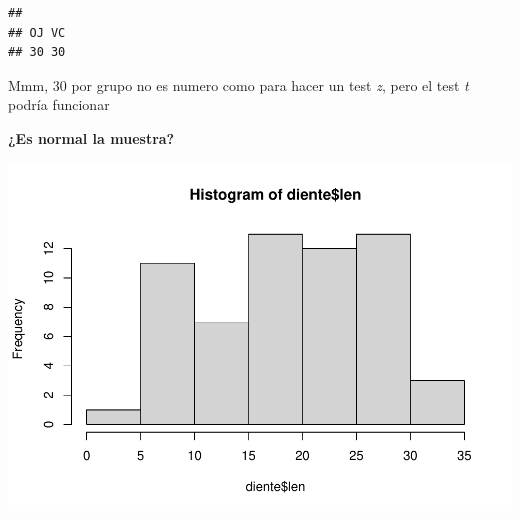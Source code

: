 \documentclass[
]{book}
\newenvironment{Shaded}{\begin{snugshade}}{\end{snugshade}}
\newcommand{\DocumentationTok}[1]{\textcolor[rgb]{0.56,0.35,0.01}{\textbf{\textit{#1}}}}
\newcommand{\FunctionTok}[1]{\textcolor[rgb]{0.00,0.00,0.00}{#1}}
\newcommand{\NormalTok}[1]{#1}
\newcommand{\SpecialCharTok}[1]{\textcolor[rgb]{0.00,0.00,0.00}{#1}}
\begin{document}
\begin{Shaded}
\end{Shaded}

\begin{verbatim}
## 
## OJ VC 
## 30 30
\end{verbatim}

Mmm, 30 por grupo no es numero como para hacer un test \emph{z}, pero el test \emph{t} podría funcionar

\textbf{¿Es normal la muestra?}

\begin{Shaded}
\end{Shaded}

\includegraphics{Esatadistica_en_R_files/figure-latex/unnamed-chunk-187-1.pdf}

\begin{Shaded}
\end{Shaded}
\end{document}
